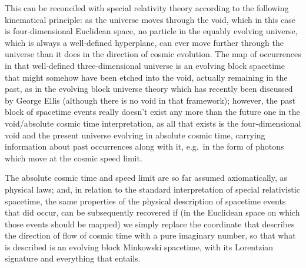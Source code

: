 This can be reconciled with special relativity theory according to the following kinematical principle: as the universe moves through the void, which in this case is four-dimensional Euclidean space, no particle in the equably evolving universe, which is always a well-defined hyperplane, can ever move further through the universe than it does in the direction of cosmic evolution. The map of occurrences in that well-defined three-dimensional universe is an evolving block spacetime that might somehow have been etched into the void, actually remaining in the past, as in the evolving block universe theory which has recently been discussed by George Ellis \cite{Ellis2007,Ellis2008,Ellis2010} (although there is no void in that framework); however, the past block of spacetime events really doesn't exist any more than the future one in the void/absolute cosmic time interpretation, as all that exists is the four-dimensional void and the present universe evolving in absolute cosmic time, carrying information about past occurrences along with it, e.g.~in the form of photons which move at the cosmic speed limit.

The absolute cosmic time and speed limit are so far assumed axiomatically, as physical laws; and, in relation to the standard interpretation of special relativistic spacetime, the same properties of the physical description of spacetime events that did occur, can be subsequently recovered if (in the Euclidean space on which those events should be mapped) we simply replace the coordinate that describes the direction of flow of cosmic time with a pure imaginary number, so that what is described is an evolving block Minkowski spacetime, with its Lorentzian signature and everything that entails. 

